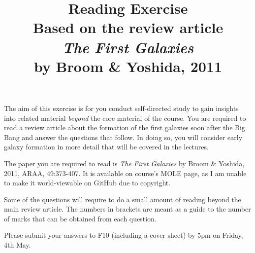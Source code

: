 \documentclass[11pt]{article}
\begin{document}
 
\title{Reading Exercise\\Based on the review article\\
{\it The First Galaxies}\\ by Broom \& Yoshida, 2011}
\maketitle
 
\noindent
The aim of this exercise is for you conduct self-directed study to gain insights into related material {\it beyond} the core material of the course. You are required to read a review article about the formation of the first galaxies soon after the Big Bang and answer the questions that follow. In doing so, you will consider early galaxy formation in more detail that will be covered in the lectures.

\vspace{2mm}
\noindent
The paper you are required to read is {\it The First Galaxies} by Broom \& Yoshida, 2011, ARAA, 49:373-407. It is available on course's MOLE page, as I am unable to make it world-viewable on GitHub due to copyright.

\vspace{2mm}
\noindent
Some of the questions will require to do a small amount of reading beyond the main review article. The numbers in brackets are meant as a guide to the number of marks that can be obtained from each question.

\vspace{2mm}
\noindent
Please submit your answers to F10 (including a cover sheet) by 5pm on Friday, 4th May.
\end{document}
